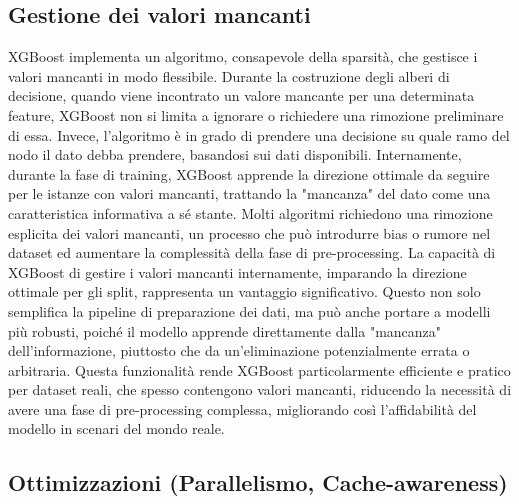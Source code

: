 \documentclass[a4paper,12pt]{report}
\begin{document}
	\subsection{Gestione dei valori mancanti}
	
	XGBoost implementa un algoritmo, consapevole della sparsità, che gestisce i valori mancanti in modo flessibile. Durante la costruzione degli alberi di decisione, quando viene incontrato un valore mancante per una determinata feature, XGBoost non si limita a ignorare o richiedere una rimozione preliminare di essa. Invece, l'algoritmo è in grado di prendere una decisione su quale ramo del nodo il dato debba prendere, basandosi sui dati disponibili. Internamente, durante la fase di training, XGBoost apprende la direzione ottimale da seguire per le istanze con valori mancanti, trattando la "mancanza" del dato come una caratteristica informativa a sé stante. Molti algoritmi richiedono una rimozione esplicita dei valori mancanti, un processo che può introdurre bias o rumore nel dataset ed aumentare la complessità della fase di pre-processing. La capacità di XGBoost di gestire i valori mancanti internamente, imparando la direzione ottimale per gli split, rappresenta un vantaggio significativo. Questo non solo semplifica la pipeline di preparazione dei dati, ma può anche portare a modelli più robusti, poiché il modello apprende direttamente dalla "mancanza" dell'informazione, piuttosto che da un'eliminazione potenzialmente errata o arbitraria. Questa funzionalità rende XGBoost particolarmente efficiente e pratico per dataset reali, che spesso contengono valori mancanti, riducendo la necessità di avere una fase di pre-processing complessa, migliorando così l'affidabilità del modello in scenari del mondo reale.
	
	\subsection{Ottimizzazioni (Parallelismo, Cache-awareness)}
	
\end{document}

